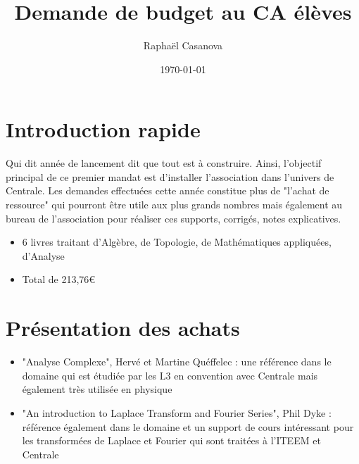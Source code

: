 \documentclass{beamer}
\title[Demande de budget]{Demande de budget au CA élèves}
\author[Centrale Mathématiques] {Raphaël Casanova}
\institute[NTU] %
{
}
\date{\today} %
\begin{document}
\begin{frame}
    \titlepage
\end{frame}

\sepframe[title = {Sommaire}]

\section{Introduction rapide}
\begin{frame}
  Qui dit année de lancement dit que tout est à construire. Ainsi, l'objectif principal de ce premier mandat est d'installer l'association dans l'univers de Centrale. 
  Les demandes effectuées cette année constitue plus de "l'achat de ressource" qui pourront être utile aux plus grands nombres mais également au bureau de l'association pour réaliser ces supports, corrigés, notes explicatives. 
  
  \begin{itemize}
    \item 6 livres traitant d'Algèbre, de Topologie, de Mathématiques appliquées, d'Analyse
    \item Total de 213,76€
  \end{itemize}
\end{frame}

\section{Présentation des achats}
\begin{frame}
  \begin{itemize}
    \item "Analyse Complexe", Hervé et Martine Quéffelec : une référence dans le domaine qui est étudiée par les L3 en convention avec Centrale mais également très utilisée en physique
    \item "An introduction to Laplace Transform and Fourier Series", Phil Dyke : référence également dans le domaine et un support de cours intéressant pour les transformées de Laplace et Fourier qui sont traitées à l'ITEEM et Centrale
  \end{itemize}
\end{frame}
\end{document}
